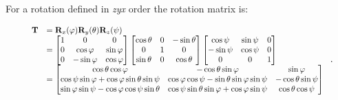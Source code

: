 \documentclass[10pt,b5paper,titlepage]{book}
\begin{document}
\begin{enumerate}
        For a rotation defined in \textit{zyx} order the rotation matrix is:

        \begin{equation}
            \scalebox{0.85}{
                $ \begin{array}{ll}
                    \mathbf{T}
                    &= \mathbf{R}_{x}(\varphi)\mathbf{R}_{y}(\theta)\mathbf{R}_{z}(\psi) \\
                    &=
                    \begin{bmatrix}
                        1 & 0 & 0 \\
                        0 & \cos \varphi & \sin \varphi \\
                        0 & -\sin \varphi & \cos \varphi
                    \end{bmatrix}
                    \begin{bmatrix}
                        \cos \theta & 0 & -\sin \theta \\
                        0 & 1 & 0 \\
                        \sin \theta & 0 & \cos \theta
                    \end{bmatrix}
                    \begin{bmatrix}
                        \cos \psi & \sin \psi & 0 \\
                        -\sin \psi & \cos \psi & 0 \\
                        0 & 0 & 1
                    \end{bmatrix} \\
                    &=
                    \begin{bmatrix}
                        \cos \theta \cos \varphi
                        & - \cos \theta \sin \varphi
                        & \sin \varphi \\
                        \cos \psi \sin \varphi + \cos \varphi \sin \theta \sin \psi
                        & \cos \varphi \cos \psi - \sin \theta \sin \varphi \sin \psi
                        & -\cos \theta \sin \psi \\
                        \sin \varphi \sin \psi - \cos \varphi \cos \psi \sin \theta
                        & \cos \psi \sin \theta \sin \varphi + \cos \varphi \sin \psi
                        & \cos \theta \cos \psi
                    \end{bmatrix}
                \end{array} $
            }
        .\end{equation}


\end{enumerate}
\end{document}
